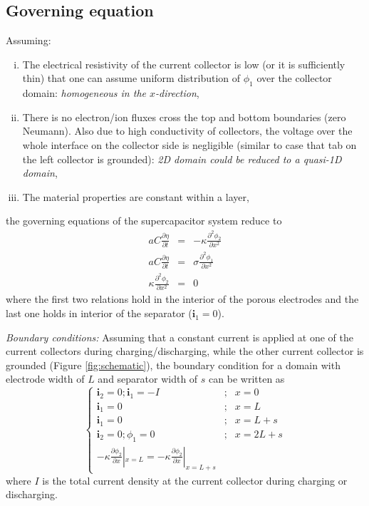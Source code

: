 \documentclass[]{article}
\begin{document}
\subsection{Governing equation}
Assuming:
\begin{enumerate}[i.]

\item The electrical resistivity of the current collector is low (or it is sufficiently thin) that one can assume uniform distribution of $\phi_1$ over the collector domain: \textit{homogeneous in the $x$-direction}, 

\item There is no electron/ion fluxes cross the top and bottom boundaries (zero Neumann). Also due to high conductivity of collectors, the voltage over the whole interface on the collector side is negligible (similar to case that tab on the left collector is grounded): \textit{2D domain could be reduced to a quasi-1D domain},

\item The material properties are constant within a layer,

\end{enumerate}
%
the governing equations of the supercapacitor system reduce to
%
\begin{eqnarray}
aC\frac{\partial\eta}{\partial t} &=& -\kappa\frac{\partial^2\phi_2}{\partial x^2} \\ 
aC\frac{\partial\eta}{\partial t} &=& \sigma\frac{\partial^2\phi_1}{\partial x^2} \label{eq:eta_phi1}\\ 
\kappa\frac{\partial^2\phi_2}{\partial x^2} &=& 0 
\end{eqnarray}
%
where the first two relations hold in the interior of the porous electrodes and the last one holds in interior of the separator ($\mathbf{i}_1=0$).

\textit{Boundary conditions:}
Assuming that a constant current is applied at one of the current collectors during charging/discharging, while the other current collector is grounded (Figure \ref{fig:schematic}), the boundary condition for a domain with electrode width of $L$ and separator width of $s$ can be written as
%
\begin{equation}
\left\{\begin{matrix}
\mathbf{i}_2 = 0; \mathbf{i}_1=-I & ;& x=0\\ 
\mathbf{i}_1 = 0  & ;& x=L\\ 
\mathbf{i}_1 = 0   & ;& x=L+s\\ 
\mathbf{i}_2 = 0 ; \phi_1=0 & ;& x=2L+s\\ 
-\kappa\frac{\partial\phi_2}{\partial x}|_{x=L} = -\kappa\frac{\partial\phi_2}{\partial x}|_{x=L+s} & &
\end{matrix}\right.
\end{equation}
%
where $I$ is the total current density at the current collector during charging or discharging.
\end{document}

